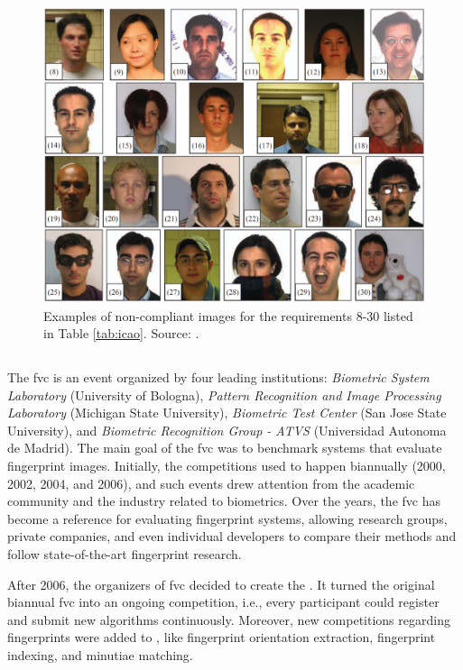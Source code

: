 

\begin{figure}[tb]
\centering
\includegraphics[width=\linewidth]{images/dataset/icao.png}
\caption{Examples of non-compliant images for the requirements 8-30 listed in Table \ref{tab:icao}. Source: \cite{maltoni2009biolab}.}
\label{fig:icao}
\end{figure}

\subsection{\fvcongoing} \label{sec:fvcongoing}

The \acf{fvc} is an event organized by four leading institutions: \textit{Biometric System Laboratory} (University of Bologna), \textit{Pattern Recognition and Image Processing Laboratory} (Michigan State University), \textit{Biometric Test Center} (San Jose State University), and \textit{Biometric Recognition Group - ATVS} (Universidad Autonoma de Madrid). The main goal of the \acs{fvc} was to benchmark systems that evaluate fingerprint images. Initially, the competitions used to happen biannually (2000, 2002, 2004, and 2006), and such events drew attention from the academic community and the industry related to biometrics. Over the years, the \acs{fvc} has become a reference for evaluating fingerprint systems, allowing research groups, private companies, and even individual developers to compare their methods and follow state-of-the-art fingerprint research.

After 2006, the organizers of \acs{fvc} decided to create the \fvcongoing. It turned the original biannual \acs{fvc} into an ongoing competition, i.e., every participant could register and submit new algorithms continuously. Moreover, new competitions regarding fingerprints were added to \fvcongoing, like fingerprint orientation extraction, fingerprint indexing, and minutiae matching.

